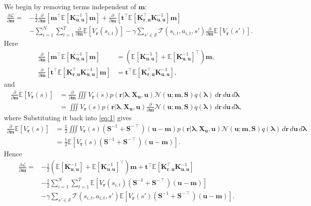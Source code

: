 \documentclass{article}
\theoremstyle{definition}
\newcommand{\Kuu}{\mathbf{K}_{\mathbf{u},\mathbf{u}}}
\newcommand{\Kru}{\mathbf{K}_{\mathbf{r},\mathbf{u}}}
\newcommand{\dm}{\frac{\partial}{\partial\mathbf{m}}}
\begin{document}
We begin by removing terms independent of $\mathbf{m}$:
\[
  \begin{split}
    \frac{\partial\mathcal{L}}{\partial\mathbf{m}} =
    &- \frac{1}{2}\dm[\mathbf{m}^\intercal\mathbb{E}[\Kuu^{-1}]\mathbf{m}]
    + \dm[\mathbf{t}^\intercal\mathbb{E}[\Kru^\intercal\Kuu^{-1}]\mathbf{m}] \\
    &- \sum_{i=1}^N \sum_{t=1}^T \dm\mathbb{E}[V_{\mathbf{r}}(s_{i,t})] -
      \gamma\sum_{s' \in \mathcal{S}} \mathcal{T}(s_{i,t}, a_{i,t},
      s')\dm\mathbb{E}[V_{\mathbf{r}}(s')].
  \end{split}
\]
Here
\begin{align*}
  \dm[\mathbf{m}^\intercal\mathbb{E}[\Kuu^{-1}]\mathbf{m}] &= (\mathbb{E}[\Kuu^{-1}] + \mathbb{E}[\Kuu^{-1}]^\intercal)\mathbf{m}, \\
  \dm[\mathbf{t}^\intercal\mathbb{E}[\Kru^\intercal\Kuu^{-1}]\mathbf{m}] &= \mathbf{t}^\intercal\mathbb{E}[\Kru^\intercal\Kuu^{-1}],
\end{align*}
and
\begin{equation} \label{eq:1}
  \begin{split}
    \dm\mathbb{E}[V_{\mathbf{r}}(s)] &= \dm\iiint V_{\mathbf{r}}(s) p(\mathbf{r} | \bm\lambda,
    \mathbf{X_u}, \mathbf{u}) \mathcal{N}(\mathbf{u}; \mathbf{m}, \mathbf{S})
    q(\bm\lambda)\,d\mathbf{r}\,d\mathbf{u}\,d\bm\lambda \\
    &= \iiint V_{\mathbf{r}}(s) p(\mathbf{r} | \bm\lambda,
    \mathbf{X_u}, \mathbf{u}) \dm\mathcal{N}(\mathbf{u}; \mathbf{m}, \mathbf{S})
    q(\bm\lambda)\,d\mathbf{r}\,d\mathbf{u}\,d\bm\lambda,
  \end{split}
\end{equation}
where
Substituting it back into \eqref{eq:1} gives
\[
  \begin{split}
    \dm\mathbb{E}[V_{\mathbf{r}}(s)] &= \frac{1}{2}\iiint V_{\mathbf{r}}(s)
    (\mathbf{S}^{-1} + \mathbf{S}^{-\intercal})(\mathbf{u} - \mathbf{m})
    p(\mathbf{r} | \bm\lambda, \mathbf{X_u}, \mathbf{u}) \mathcal{N}(\mathbf{u};
    \mathbf{m}, \mathbf{S})
    q(\bm\lambda)\,d\mathbf{r}\,d\mathbf{u}\,d\bm\lambda \\
    &= \frac{1}{2}\mathbb{E}[V_{\mathbf{r}}(s) (\mathbf{S}^{-1} +
    \mathbf{S}^{-\intercal})(\mathbf{u} - \mathbf{m})].
\end{split}
\]
Hence
\[
  \begin{split}
    \frac{\partial\mathcal{L}}{\partial\mathbf{m}} =
    &-\frac{1}{2}(\mathbb{E}[\Kuu^{-1}] +
    \mathbb{E}[\Kuu^{-1}]^\intercal)\mathbf{m} +
    \mathbf{t}^\intercal\mathbb{E}[\Kru^\intercal\Kuu^{-1}] \\
    &- \frac{1}{2}\sum_{i=1}^N\sum_{t=1}^T \mathbb{E}[V_{\mathbf{r}}(s_{i,t})
    (\mathbf{S}^{-1} + \mathbf{S}^{-\intercal})(\mathbf{u} - \mathbf{m})] \\
    &- \gamma\sum_{s' \in \mathcal{S}} \mathcal{T}(s_{i,t}, a_{i,t}, s')
    \mathbb{E}[V_{\mathbf{r}}(s') (\mathbf{S}^{-1} + \mathbf{S}^{-\intercal})(\mathbf{u} -
    \mathbf{m})].
\end{split}
\]
\end{document}
